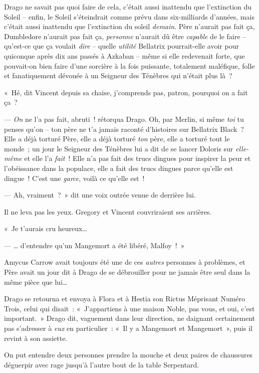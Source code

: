Drago ne savait pas quoi faire de cela, c'était aussi inattendu que l'extinction du Soleil -- enfin, le Soleil s'éteindrait comme prévu dans six-milliards d'années, mais c'était aussi inattendu que l'extinction du soleil \emph{demain}. Père n'aurait pas fait ça, Dumbledore n'aurait pas fait ça, \emph{personne} n'aurait dû être \emph{capable} de le faire -- qu'est-ce que ça voulait \emph{dire} -- quelle \emph{utilité} Bellatrix pourrait-elle avoir pour quiconque après dix ans passés à Azkaban -- même si elle redevenait forte, que pouvait-on bien faire d'une sorcière à la fois puissante, totalement maléfique, folle et fanatiquement dévouée à un Seigneur des Ténèbres qui n'était plus là~?

«~Hé, dit Vincent depuis sa chaise, j'comprends pas, patron, pourquoi on a fait ça~?

--- \emph{On} ne l'a pas fait, abruti~! rétorqua Drago. Oh, par Merlin, si même \emph{toi} tu penses qu'on -- ton père ne t'a jamais raconté d'histoires sur Bellatrix Black~? Elle a déjà torturé Père, elle a déjà torturé \emph{ton} père, elle a torturé tout le monde~; un jour le Seigneur des Ténèbres lui a dit de se lancer Doloris sur \emph{elle-même} et elle l'a \emph{fait}~! Elle n'a pas fait des trucs dingues pour inspirer la peur et l'obéissance dans la populace, elle a fait des trucs dingues parce qu'elle est dingue~! C'est une \emph{garce}, voilà ce qu'elle est~!

--- Ah, vraiment~?~» dit une voix outrée venue de derrière lui.

Il ne leva pas les yeux. Gregory et Vincent couvriraient ses arrières.

«~Je t'aurais cru heureux…

--- … d'entendre qu'un Mangemort a été libéré, Malfoy~!~»

Amycus Carrow avait toujours été une de ces \emph{autres} personnes à problèmes, et Père avait un jour dit à Drago de se débrouiller pour ne jamais être seul dans la même pièce que lui…

Drago se retourna et envoya à Flora et à Hestia son Rictus Méprisant Numéro Trois, celui qui disait~: «~J'appartiens à une maison Noble, pas vous, et oui, c'est important.~» Drago dit, vaguement dans leur direction, ne daignant certainement pas s'adresser à \emph{eux} en particulier~: «~Il y a Mangemort et Mangemort~», puis il revint à son assiette.

On put entendre deux personnes prendre la mouche et deux paires de chaussures déguerpir avec rage jusqu'à l'autre bout de la table Serpentard.

